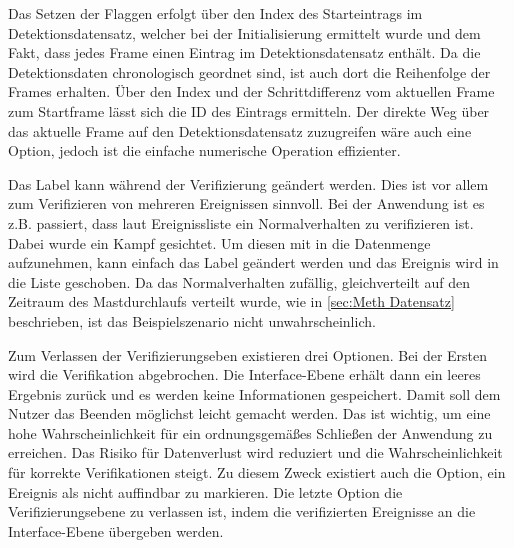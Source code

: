 Das Setzen der Flaggen erfolgt über den Index des Starteintrags im Detektionsdatensatz, welcher bei der Initialisierung ermittelt wurde und dem Fakt, dass jedes Frame einen Eintrag im Detektionsdatensatz enthält. Da die Detektionsdaten chronologisch geordnet sind, ist auch dort die Reihenfolge der Frames erhalten. Über den Index und der Schrittdifferenz vom aktuellen Frame zum Startframe lässt sich die ID des Eintrags ermitteln. Der direkte Weg über das aktuelle Frame auf den Detektionsdatensatz zuzugreifen wäre auch eine Option, jedoch ist die einfache numerische Operation effizienter. \par

Das Label kann während der Verifizierung geändert werden. Dies ist vor allem zum Verifizieren von mehreren Ereignissen sinnvoll. Bei der Anwendung ist es z.B. passiert, dass laut Ereignissliste ein Normalverhalten zu verifizieren ist. Dabei wurde ein Kampf gesichtet. Um diesen mit in die Datenmenge aufzunehmen, kann einfach das Label geändert werden und das Ereignis wird in die Liste geschoben. Da das Normalverhalten zufällig, gleichverteilt auf den Zeitraum des Mastdurchlaufs verteilt wurde, wie in \autoref{sec:Meth Datensatz} beschrieben, ist das Beispielszenario nicht unwahrscheinlich. \par

Zum Verlassen der Verifizierungseben existieren drei Optionen. Bei der Ersten wird die Verifikation abgebrochen. Die Interface-Ebene erhält dann ein leeres Ergebnis zurück und es werden keine Informationen gespeichert. Damit soll dem Nutzer das Beenden möglichst leicht gemacht werden. Das ist wichtig, um eine hohe Wahrscheinlichkeit für ein ordnungsgemäßes Schließen der Anwendung zu erreichen. Das Risiko für  Datenverlust wird reduziert und die Wahrscheinlichkeit für korrekte Verifikationen steigt. Zu diesem Zweck existiert auch die Option, ein Ereignis als nicht auffindbar zu markieren. Die letzte Option die Verifizierungsebene zu verlassen ist, indem die verifizierten Ereignisse an die Interface-Ebene übergeben werden. 

